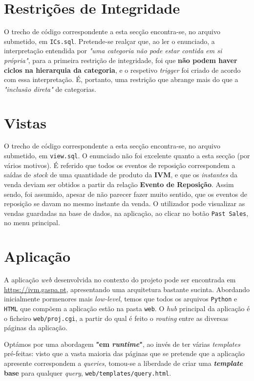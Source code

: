 \documentclass[12pt,a4paper]{article}
\begin{document}
\section*{Restrições de Integridade}

O trecho de código correspondente a esta secção encontra-se, no arquivo submetido,
em \texttt{ICs.sql}. Pretende-se realçar que, ao ler o enunciado, a interpretação
entendida por \textit{"uma categoria não pode estar contida em si própria"}, para
a primeira restrição de integridade, foi que \textbf{não podem haver ciclos na
  hierarquia da categoria}, e o respetivo \textit{trigger} foi criado de acordo
com essa interpretação. É, portanto, uma restrição que abrange mais do que
a \textit{"inclusão direta"} de categorias.

\section*{Vistas}

O trecho de código correspondente a esta secção encontra-se, no arquivo submetido,
em \texttt{view.sql}. O enunciado não foi excelente quanto a esta secção (por vários motivos).
É referido que todos os eventos de reposição correspondem a saídas de \textit{stock} de uma
quantidade de produto da \textbf{IVM}, e que os \textit{instantes} da venda
deviam ser obtidos a partir da relação \textbf{Evento de Reposição}. Assim sendo,
foi assumido, apesar de não parecer fazer muito sentido, que os eventos de reposição
se davam no mesmo instante da venda. O utilizador pode visualizar as vendas guardadas
na base de dados, na aplicação, ao clicar no botão \texttt{Past Sales}, no menu principal.

\section*{Aplicação}

A aplicação \textit{web} desenvolvida no contexto do projeto pode ser encontrada
em \url{https://ivm.gaspa.pt}, apresentando uma arquitetura bastante sucinta.
Abordando inicialmente pormenores mais \textit{low-level}, temos que todos os arquivos
\texttt{Python} e \texttt{HTML} que compõem a aplicação estão na pasta \texttt{web}.
O \textit{hub} principal da aplicação é o ficheiro \texttt{web/proj.cgi}, a partir do qual
é feito o \textit{routing} entre as diversas páginas da aplicação.

Optámos por uma abordagem \textbf{"em \textit{runtime}"}, ao invés de ter várias \textit{templates}
pré-feitas: visto que a vasta maioria das páginas que se pretende que a aplicação
apresente correspondem a \textit{queries}, tomou-se a liberdade de criar uma
\textbf{\textit{template} base} para qualquer \textit{query}, \texttt{web/templates/query.html}.
\end{document}
